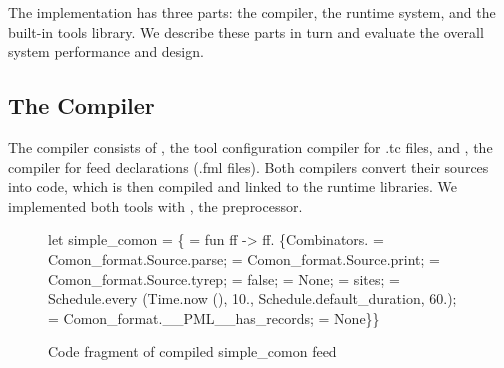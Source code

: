 The \padsd{} implementation has three parts: the compiler, the runtime
system, and the built-in tools library. We describe these
parts in turn and evaluate the overall system performance and design.


\subsection{The Compiler}
The \padsd{} compiler consists of
, the tool configuration compiler for .tc files, 
and 
, the compiler for feed declarations (.fml files). 
Both compilers convert their sources into \ocaml{} code, which is then
compiled
and linked to the runtime libraries.  We implemented both tools with
\camlp{}, the \ocaml{} preprocessor. 

\begin{figure}[t]
\centering
\begin{codebox}
let simple_comon =
\{ = fun ff ->
 ff.
 \{Combinators. = Comon_format.Source.parse;
   = Comon_format.Source.print;
   = Comon_format.Source.tyrep; 
   = false;
   = None; 
   = sites;
   =
    Schedule.{\kw every} (Time.now (), 10., 
                    Schedule.default_duration, 60.);
   = Comon_format.__PML__has_records; 
   = None\}\}
\end{codebox}
\caption{Code fragment of compiled simple\_comon feed}\label{fig:compiledcomon}
\end{figure}

